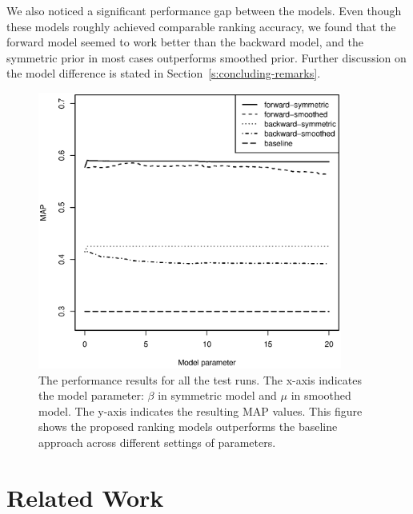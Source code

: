 We also noticed a significant performance gap between the models.  Even though
these models roughly achieved comparable ranking accuracy, we found that the
forward model seemed to work better than the backward model, and the symmetric
prior in most cases outperforms smoothed prior.  Further discussion on the
model difference is stated in Section~\ref{s:concluding-remarks}.

\begin{figure}[ht!]
  \centering
  \includegraphics[width=10cm]{performance.eps}
  \caption{The performance results for all the test runs.  The x-axis indicates
  the model parameter: $\beta$ in symmetric model and $\mu$ in smoothed model.
  The y-axis indicates the resulting MAP values.  This figure shows the
  proposed ranking models outperforms the baseline approach across different
  settings of parameters.} \label{f:performance}
\end{figure}

\section{Related Work}\label{s:related-work}


